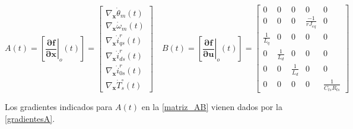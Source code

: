 \documentclass[a4paper, 10pt, onecolumn,journal]{ieeeconf}
\begin{document}
\begin{equation}
    A(t) = \left[ \left. \frac{\mathbf{\partial f}}{\mathbf{\partial x}} \right|_{o}(t) \right] =
    \begin{bmatrix}
        \nabla_{\mathbf{x}} \dot{\theta}_m(t) \\ 
        \nabla_{\mathbf{x}} \dot{\omega}_m(t) \\
        \nabla_{\mathbf{x}} \dot{i}^r_{qs}(t) \\ 
        \nabla_{\mathbf{x}} \dot{i}^r_{ds}(t) \\ 
        \nabla_{\mathbf{x}} \dot{i}^r_{0s}(t) \\ 
        \nabla_{\mathbf{x}} \dot{T}^\circ_s(t) 
    \end{bmatrix}\quad
    B(t) = \left[ \left. \frac{\mathbf{\partial f}}{\mathbf{\partial u}} \right|_{o}(t) \right] =
    \begin{bmatrix}
        0 & 0 & 0 & 0 & 0\\
        0 & 0 & 0 & \frac{-1}{r J_{eq}} & 0\\
        \frac{1}{L_q} & 0 & 0 & 0 & 0\\
        0 & \frac{1}{L_d} & 0 & 0 & 0\\
        0 & 0 & \frac{1}{L_d} & 0 & 0\\
        0 & 0 & 0 & 0 & \frac{1}{C_{ts} R_{ts}}
    \end{bmatrix}
    \label{matriz_AB}
\end{equation}

Los gradientes indicados para $A(t)$ en la \cref{matriz_AB} vienen dados por la \cref{gradientesA}.
\end{document}
